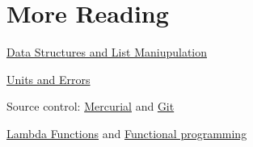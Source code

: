 \documentclass[justified]{tufte-handout}
\newcommand{\listTutorialLink}
  {https://docs.python.org/2/tutorial/datastructures.html}
\newcommand{\pintLink}{http://pint.readthedocs.org/en/0.6/}
\newcommand{\hgLink}{http://mercurial.selenic.com/}
\newcommand{\gitLink}{http://git-scm.com/}
\newcommand{\lambdaTutorialLink}
  {https://pythonconquerstheuniverse.wordpress.com/2011/08/29/lambda_tutorial/}
\newcommand{\functionalProgrammingLink}
  {http://www.ibm.com/developerworks/library/l-prog/}
\begin{document}



\pagebreak

\section*{More Reading}
\begin{description}
\item \href{\listTutorialLink}{Data Structures and List Maniupulation}

\item \href{\pintLink}{Units and Errors}

\item Source control: \href{\hgLink}{Mercurial} and \href{\gitLink}{Git}

\item \href{\lambdaTutorialLink}{Lambda Functions} and
  \href{\functionalProgrammingLink}{Functional programming}

\end{description}
\end{document}
